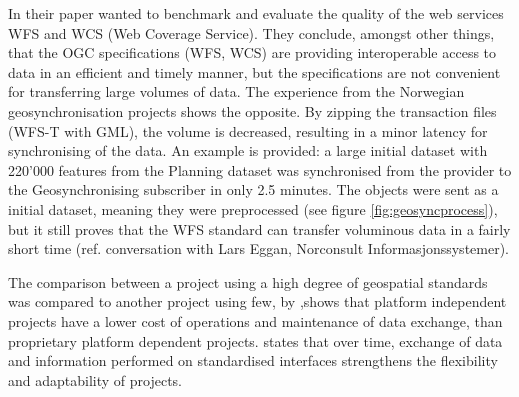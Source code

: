 
In their paper \cite{giuliani2013} wanted to benchmark and evaluate the quality of the web services WFS and WCS (Web Coverage Service). They conclude, amongst other things, that the OGC specifications (WFS, WCS) are providing interoperable access to data in an efficient and timely manner, but the specifications are not convenient for transferring large volumes of data.  The experience from the Norwegian geosynchronisation projects shows the opposite. By zipping the transaction files (WFS-T with GML), the volume is decreased, resulting in a minor latency for synchronising of the data. An example is provided: a large initial dataset with 220'000 features from the Planning dataset was synchronised from the provider to the Geosynchronising subscriber in only 2.5 minutes. The objects were sent as a initial dataset, meaning they were preprocessed  (see figure \ref{fig:geosyncprocess}), but it still proves that the WFS standard can transfer voluminous data in a fairly short time (ref. conversation with Lars Eggan, Norconsult Informasjonssystemer).

The comparison between a project using a high degree of geospatial standards was compared to another project using few, by \cite{AllenHamilton2005},shows that platform independent projects %
have a lower cost of operations and maintenance of data exchange, than proprietary platform dependent projects. \cite{giuliani2013} states that over time, exchange of data and information performed on standardised interfaces strengthens the flexibility and adaptability of projects.



